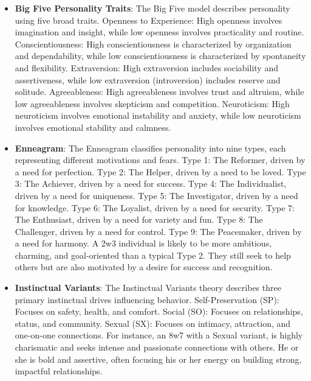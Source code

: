 \documentclass[letterpaper]{article} %
\begin{document}
\begin{itemize}
  \item \textbf{Big Five Personality Traits}: The Big Five model describes personality using five broad traits. Openness to Experience: High openness involves imagination and insight, while low openness involves practicality and routine. Conscientiousness: High conscientiousness is characterized by organization and dependability, while low conscientiousness is characterized by spontaneity and flexibility. Extraversion: High extraversion includes sociability and assertiveness, while low extraversion (introversion) includes reserve and solitude. Agreeableness: High agreeableness involves trust and altruism, while low agreeableness involves skepticism and competition. Neuroticism: High neuroticism involves emotional instability and anxiety, while low neuroticism involves emotional stability and calmness.
  \item \textbf{Enneagram}: The Enneagram classifies personality into nine types, each representing different motivations and fears. Type 1: The Reformer, driven by a need for perfection. Type 2: The Helper, driven by a need to be loved. Type 3: The Achiever, driven by a need for success. Type 4: The Individualist, driven by a need for uniqueness. Type 5: The Investigator, driven by a need for knowledge. Type 6: The Loyalist, driven by a need for security. Type 7: The Enthusiast, driven by a need for variety and fun. Type 8: The Challenger, driven by a need for control. Type 9: The Peacemaker, driven by a need for harmony. A 2w3 individual is likely to be more ambitious, charming, and goal-oriented than a typical Type 2. They still seek to help others but are also motivated by a desire for success and recognition.
  \item \textbf{Instinctual Variants}: The Instinctual Variants theory describes three primary instinctual drives influencing behavior. Self-Preservation (SP): Focuses on safety, health, and comfort. Social (SO): Focuses on relationships, status, and community. Sexual (SX): Focuses on intimacy, attraction, and one-on-one connections. For instance, an 8w7 with a Sexual variant, is highly charismatic and seeks intense and passionate connections with others. He or she is bold and assertive, often focusing his or her energy on building strong, impactful relationships.
\end{itemize}
\end{document}
